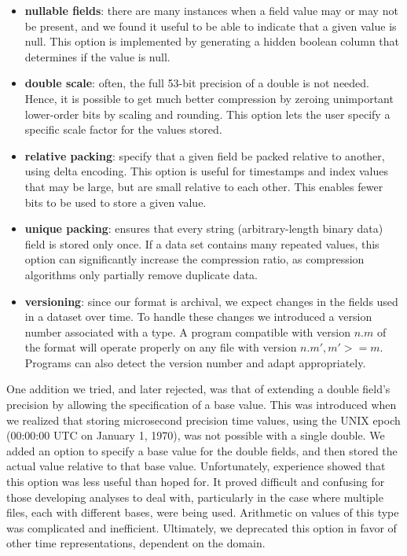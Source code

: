 \documentclass{acm_proc_article-sp}
\begin{document}
\begin{itemize}

\item \textbf{nullable fields}: there are many instances when a field
value may or may not be present, and we found it useful to be able to
indicate that a given value is null. This option is implemented by
generating a hidden boolean column that determines if the value is null.

\item \textbf{double scale}: often, the full 53-bit precision of a double
is not needed. Hence, it is possible to get
much better compression by zeroing unimportant 
lower-order bits 
by scaling and rounding. This option lets the user specify
a specific scale factor for the values stored.

\item \textbf{relative packing}: specify that a given field be packed
relative to another, using delta encoding. This option is useful
for timestamps and index values that may be large, but are small
relative to each other. This enables fewer bits to be used to store a
given value.

\item \textbf{unique packing}: ensures that every string 
(arbitrary-length binary data) field is stored only once. If a 
data set
contains many repeated values, this option can significantly increase
the 
compression ratio, as compression algorithms only partially
remove duplicate data.

\item \textbf{versioning}: since our format is archival, we expect
changes in the fields used in a dataset over time.  To handle these
changes we 
introduced a version number associated with a type.
A program compatible with version $n.m$ of the format will operate
properly on any file with version $n.m', m' >= m$.  Programs can also
detect the version number and adapt appropriately.

\end{itemize}

One addition we tried, and later rejected, was that of extending a
double field's
precision by allowing the specification of a base value.
This was introduced when we realized that storing microsecond precision
time values, using the UNIX epoch (00:00:00 UTC on January 1, 1970),
was not possible with a single double. We added an option to
specify a base value for the double fields, and then stored the actual
value relative to that base value.
Unfortunately, experience showed that this option
was less useful than hoped for. It proved difficult and confusing for
those developing analyses to deal with, particularly in the case where
multiple files, each with different bases, were being used. Arithmetic
on values of this type was complicated and inefficient. Ultimately, we
deprecated this option in favor of other time representations,
dependent on the domain. 
\end{document}
